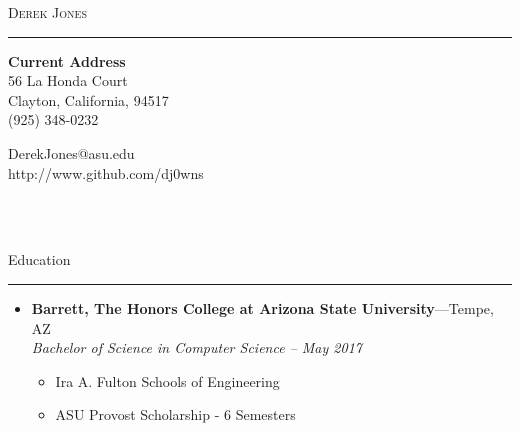 \documentclass[10pt,oneside]{article}
\makeatletter
\newcommand{\name}{Derek Jones}
\newcommand{\homeaddrtop}{56 La Honda Court}
\newcommand{\homeaddrbot}{Clayton, California, 94517}
\newcommand{\cellphone}{(925) 348-0232}
\newcommand{\email}{DerekJones@asu.edu}
\newcommand{\github}{http://www.github.com/dj0wns}
\newcommand{\bigname}[1]{
	\begin{center}\huge\scshape#1\end{center}
}
\newcommand{\sectitle}[1]{
	\begin{flushleft}{\fontfamily{phv}\selectfont\Large#1}\end{flushleft}
}
\newenvironment{ressection}[1]{
	\vspace{2pt}
	\sectitle{#1}
	\vspace{-10pt}\rule{\textwidth}{0.5pt}
	\vspace{-10pt}
	\begin{itemize}
	\vspace{3pt}
}{
	\end{itemize}
}
\newcommand{\resitem}[1]{
	\vspace{-4pt}
	\item \begin{flushleft} #1 \end{flushleft}
}
\newcommand{\ressubitem}[1]{
	\vspace{-1pt}
	\item \begin{flushleft} #1 \end{flushleft}
}
\newcommand{\resbigitem}[3]{
	\vspace{-5pt}
	\item
	\textbf{#1}---#2 \\
	\textit{#3}
}
\newenvironment{ressubsec}[3]{
	\resbigitem{#1}{#2}{#3}
	\vspace{-2pt}
	\begin{itemize}
}{
	\end{itemize}
}
\makeatother
\begin{document}
 \selectfont

\bigname{\name}
\vspace{-6pt} \rule{\textwidth}{1pt}
\vspace{-22pt}
\begin{multicols}{3}
	
	{\bfseries Current Address}\\
	\homeaddrtop\\
	\homeaddrbot\\
	\cellphone\\
	
	\columnbreak
	\begin{center}
		\email\\
		\github\\
	\end{center}
	
	\columnbreak
	\hfill \\
	\hfill\\

\end{multicols}

\vspace{-24 pt}




\vspace{\baselineskip}
\begin{ressection}{Education}
	\begin{ressubsec}{Barrett, The Honors College at Arizona State University}{Tempe, AZ}{Bachelor of Science in Computer Science -- May 2017}
		\ressubitem{Ira A. Fulton Schools of Engineering}
		\ressubitem{ASU Provost Scholarship - 6 Semesters}
	\end{ressubsec}
	

\end{ressection}
\end{document}
